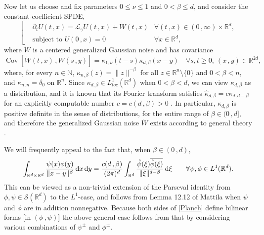 \documentclass[reqno]{amsart}
\DeclareMathOperator{\Cov}{Cov}
\newcommand{\<}{\langle}
\renewcommand{\>}{\rangle}
\newcommand{\R}{\mathbb{R}}
\newcommand{\1}{\mathbb{1}}
\renewcommand{\d}{{\rm d}}
\renewcommand{\ge}{\geqslant}
\renewcommand{\le}{\leqslant}
\theoremstyle{definition}
\numberwithin{equation}{section}
\begin{document}
Now let us choose and fix parameters $0\le\nu\le 1$ and $0<\beta\le d$,
and consider the constant-coefficient SPDE,
\begin{equation}\label{SHE:beta}\left[\begin{split}
	&\partial_t U(t\,,x) = \mathcal{L}_\gamma U(t\,,x)+ \dot{W}(t\,,x)&
		\forall (t\,,x)\in(0\,,\infty)\times\R^d,\\[-2mm]
	&\text{subject to }U(0\,,x) = 0&\forall x\in\R^d,
\end{split}\right.\end{equation}
where $\dot{W}$ is a centered generalized Gaussian noise and has covariance
\[
	\Cov[ \dot{W}(t\,,x)\,,\dot{W}(s\,,y)] = \kappa_{1,\nu}(t-s)
	\kappa_{d,\beta}(x-y)
	\quad\forall s,t\ge0,\ (x\,,y)\in\R^{2d},
\]
where, for every $n\in\mathbb{N}$,
$\kappa_{n,\beta}(z) = \|z\|^{-\beta}$ for all $z\in\R^n\setminus\{0\}$
and $0<\beta<n$, and $\kappa_{n,n}=\delta_0$ on $\R^n$.
Since $\kappa_{d,\beta}\in L^1_{\textit{loc}}(\R^d)$ when $0<\beta<d$,
we can view $\kappa_{d,\beta}$ as a distribution, and it is known that its Fourier transform
satisfies $\hat{\kappa}_{d,\beta} = c\kappa_{d,d-\beta}$ for an explicitly computable
number  $c=c(d\,,\beta)>0$ \cite[(12.10)]{Mattila}. In particular,
$\kappa_{d,\beta}$ is positive definite in the sense of distributions, for the entire range of 
$\beta\in(0\,,d]$,
and therefore the generalized Gaussian noise $\dot{W}$ exists according
to general theory \cite{Dudley,Minlos,DFL,Gross}.

We will frequently appeal to the fact
that, when $\beta\in(0\,,d)$,
\begin{equation}\label{Planch}
	\int_{\R^d\times\R^d} \frac{\psi(x)\phi(y)}{\|x-y\|^\beta}\,\d x\,\d y
	= \frac{c(d\,,\beta)}{(2\pi)^d}\int_{\R^d} \frac{\hat\psi(\xi)
	\overline{\hat\phi(\xi)}}{
	\|\xi\|^{d-\beta}}\,\d\xi\qquad\forall \psi,\phi\in L^1(\R^d).
\end{equation}
This can be viewed as a non-trivial 
extension of the Parseval identity from $\phi,\psi\in\mathcal{S}(\R^d)$ 
to the $L^1$-case,
and follows from Lemma 12.12 of Mattila \cite{Mattila} when $\psi$ and $\phi$ are in addition nonnegative.
Because both sides of \eqref{Planch} define bilinear forms [in $(\phi\,,\psi)$]
the above general case follows from that by considering various combinations
of $\psi^\pm$ and $\phi^\pm$.
\end{document}
